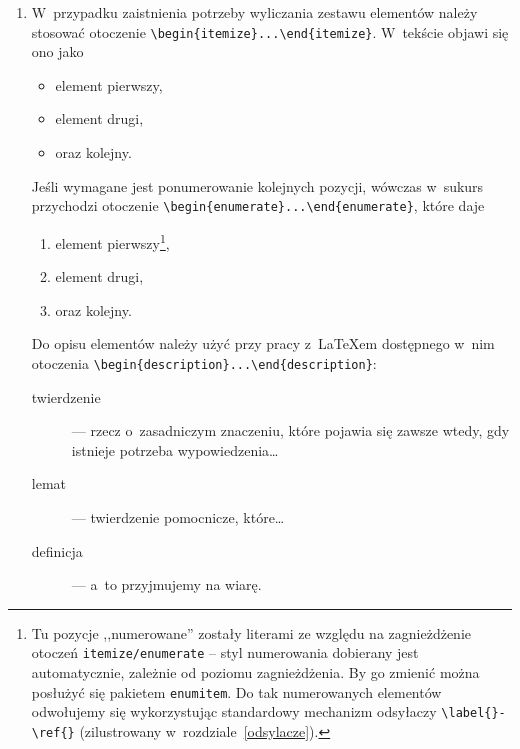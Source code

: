 \begin{enumerate}
\item W~przypadku zaistnienia potrzeby wyliczania zestawu elementów należy
stosować otoczenie \verb+\begin{itemize}...\end{itemize}+. W~tekście
objawi się ono jako
\begin{itemize}
\item element pierwszy,
\item element drugi,
\item oraz kolejny.
\end{itemize}
Jeśli wymagane jest ponumerowanie kolejnych pozycji, wówczas w~sukurs
przychodzi otoczenie
\verb+\begin{enumerate}...\end{enumerate}+, które daje
\begin{enumerate}
\item element pierwszy\footnote{Tu pozycje ,,numerowane'' zostały
  literami ze względu na zagnieżdżenie otoczeń
  \texttt{i\-te\-mi\-ze/e\-nu\-me\-ra\-te} -- styl numerowania dobierany jest
  automatycznie, zależnie od poziomu zagnieżdżenia. By go zmienić
  można posłużyć się pakietem \texttt{enumitem}. Do tak numerowanych elementów odwołujemy się wykorzystując standardowy mechanizm odsyłaczy \texttt{\textbackslash label\{\}-\textbackslash ref\{\}} (zilustrowany w~rozdziale~\ref{odsylacze}).},
\item element drugi,
\item oraz kolejny.
\end{enumerate}
Do opisu elementów należy użyć przy pracy z~\LaTeX{}em dostępnego
w~nim otoczenia \verb+\begin{description}...\end{description}+:
\begin{description}
\item[twierdzenie] --- rzecz o~zasadniczym znaczeniu, które pojawia
  się zawsze wtedy, gdy istnieje potrzeba wypowiedzenia\ldots
\item[lemat] --- twierdzenie pomocnicze, które\ldots
\item [definicja] --- a~to przyjmujemy na wiarę.
\end{description}


\end{enumerate}
